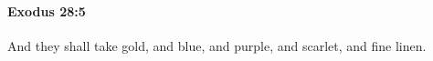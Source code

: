 
		\paragraph{Exodus 28:5} %
			\label{EXODUS-28-5}

			And they shall take gold, and blue, and purple, and scarlet, and fine linen.


